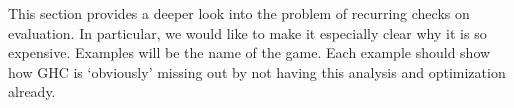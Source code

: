 This section provides a deeper look into the problem of recurring checks on evaluation.
In particular, we would like to make it especially clear why it is so expensive.
Examples will be the name of the game.
Each example should show how GHC is `obviously' missing out by not having this analysis and optimization already.
